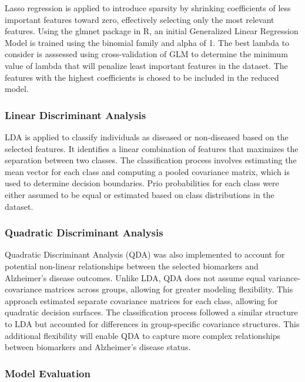 \documentclass[12pt]{article}
\begin{document}
Lasso regression is applied to introduce sparsity by shrinking coefficients of less important features toward zero, effectively selecting only the most relevant features. Using the glmnet package in R, an initial Generalized Linear Regression Model
is trained using the binomial family and alpha of 1. The best lambda to consider is asssessed using cross-validation of GLM to determine the minimum value of lambda that will penalize least important features in the dataset. The features with the highest 
coefficients is chosed to be included in the reduced model. 

\subsubsection{Linear Discriminant Analysis}
\noindent

LDA is applied to classify individuals as diseased or non-diseased based on the selected features. It identifies a linear combination of features that maximizes the separation between two classes. The classification process involves estimating the mean vector 
for each class and computing a pooled covariance matrix, which is used to determine decision boundaries. Prio probabilities for each class were either assumed to be equal or estimated based on class distributions in the dataset. 

\subsubsection{Quadratic Discriminant Analysis}
\noindent

Quadratic Discriminant Analysis (QDA) was also implemented to account for potential non-linear relationships between the selected biomarkers and Alzheimer’s disease outcomes. Unlike LDA, QDA does not assume equal variance-covariance matrices across groups, 
allowing for greater modeling flexibility. This approach estimated separate covariance matrices for each class, allowing for quadratic decision surfaces. The classification process followed a similar structure to LDA but accounted for differences in group-specific 
covariance structures. This additional flexibility will enable QDA to capture more complex relationships between biomarkers and Alzheimer’s disease status.

\subsubsection{Model Evaluation}
\noindent
\end{document}
